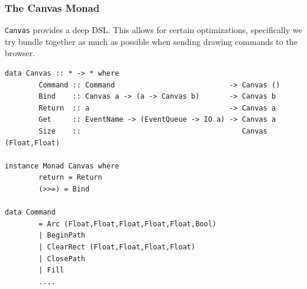 \documentclass{beamer}
\begin{document}
\begin{frame}[fragile]
\frametitle{The Canvas Monad}

{\tt Canvas} provides a deep DSL. This allows for certain optimizations,
specifically we try bundle together as much as possible when
sending drawing commands to the browser.

\begin{codeblock}
\tiny
\begin{verbatim}
data Canvas :: * -> * where
        Command :: Command                           -> Canvas ()
        Bind    :: Canvas a -> (a -> Canvas b)       -> Canvas b
        Return  :: a                                 -> Canvas a
        Get     :: EventName -> (EventQueue -> IO a) -> Canvas a
        Size    ::                                      Canvas (Float,Float)

instance Monad Canvas where
        return = Return
        (>>=) = Bind

data Command
        = Arc (Float,Float,Float,Float,Float,Bool)
        | BeginPath
        | ClearRect (Float,Float,Float,Float)
        | ClosePath
        | Fill
        ....
\end{verbatim}

\end{codeblock}

\end{frame}
\end{document}
